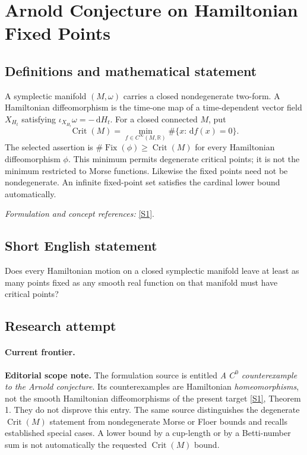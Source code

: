 \documentclass[11pt,a4paper]{article}
\newcommand{\R}{\mathbb{R}}
\newcommand{\dd}{\,\mathrm d}
\newcommand{\sref}[2]{\hyperlink{source:#1:#2}{[S#2]}}
\newif\ifshowcatalogue
\newcommand{\cataloguescope}[1]{\ifshowcatalogue
 \paragraph{Exact scope in the supplied catalogue.}
 \begin{quote}\small #1\end{quote}\fi}
\numberwithin{equation}{section}
\begin{document}
\setcounter{section}{177}
\clearpage
\section{\texorpdfstring{Arnold Conjecture on Hamiltonian Fixed Points}{Arnold Conjecture on Hamiltonian Fixed Points}}\label{178}
\subsection{Definitions and mathematical statement}
A symplectic manifold $(M,\omega)$ carries a closed nondegenerate two-form. A Hamiltonian diffeomorphism is the time-one map of a time-dependent vector field $X_{H_t}$ satisfying $\iota_{X_{H_t}}\omega=-\dd H_t$. For a closed connected $M$, put
\[
 \operatorname{Crit}(M)=\min_{f\in C^\infty(M,\R)}\#\{x:\dd f(x)=0\}.
\]
The selected assertion is $\#\operatorname{Fix}(\phi)\ge\operatorname{Crit}(M)$ for every Hamiltonian diffeomorphism $\phi$. This minimum permits degenerate critical points; it is not the minimum restricted to Morse functions. Likewise the fixed points need not be nondegenerate. An infinite fixed-point set satisfies the cardinal lower bound automatically.
\par\smallskip\textit{Formulation and concept references:} \sref{178}{1}.
\cataloguescope{Prove that every Hamiltonian diffeomorphism of an arbitrary closed connected symplectic manifold has at least Crit(M) fixed points, where Crit(M) is the minimum number of critical points of a smooth function on M.}
\subsection{Short English statement}
Does every Hamiltonian motion on a closed symplectic manifold leave at least as many points fixed as any smooth real function on that manifold must have critical points?
\subsection{Research attempt}

\paragraph{Current frontier.}
\textbf{Editorial scope note.} The formulation source is entitled
\emph{A $C^0$ counterexample to the Arnold conjecture}. Its counterexamples
are Hamiltonian \emph{homeomorphisms}, not the smooth Hamiltonian
diffeomorphisms of the present target \sref{178}{1}, Theorem 1. They do
not disprove this entry. The same source distinguishes the degenerate
$\operatorname{Crit}(M)$ statement from nondegenerate Morse or Floer
bounds and recalls established special cases. A lower bound by a cup-length
or by a Betti-number sum is not automatically the requested
$\operatorname{Crit}(M)$ bound.
\end{document}
